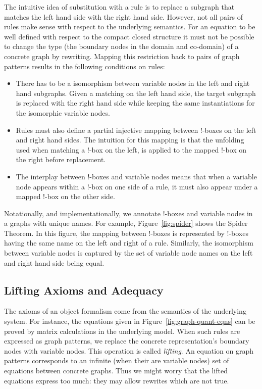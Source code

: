 \documentclass[runningheads]{llncs}
\begin{document}
The intuitive idea of substitution with a rule is to replace a
subgraph that matches the left hand side with the right hand side.
However, not all pairs of rules make sense with respect to the
underlying semantics. For an equation to be well defined with respect
to the compact closed structure it must not be possible to change the
type (the boundary nodes in the domain and co-domain) of a concrete
graph by rewriting.  Mapping this restriction back to pairs of graph
patterns results in the following conditions on rules:

\begin{itemize}

\item There has to be a isomorphism between variable nodes in the left
  and right hand subgraphs. Given a matching on the left hand side,
  the target subgraph is replaced with the right hand side while
  keeping the same instantiations for the isomorphic variable nodes.

\item Rules must also define a partial injective mapping between
  !-boxes on the left and right hand sides. The intuition for this
  mapping is that the unfolding used when matching a !-box on the
  left, is applied to the mapped !-box on the right before
  replacement.

\item The interplay between !-boxes and variable nodes means that when
  a variable node appears within a !-box on one side of a rule, it must
  also appear under a mapped !-box on the other side.

\end{itemize}

Notationally, and implementationally, we annotate !-boxes and variable
nodes in a graphs with unique names. For example,
Figure~\ref{fig:spider} shows the Spider Theorem. In this
figure, the mapping between !-boxes is represented by !-boxes having
the same name on the left and right of a rule.  Similarly, the
isomorphism between variable nodes is captured by the set of variable
node names on the left and right hand side being equal.

\subsection{Lifting Axioms and Adequacy} 

The axioms of an object formalism come from the semantics of the
underlying system. For instance, the equations given in
Figure~\ref{fig:graph-quant-eqns} can be proved by matrix
calculations in the underlying model. When such rules are expressed
as graph patterns, we replace the concrete representation's boundary
nodes with variable nodes. This operation is called \emph{lifting}. An
equation on graph patterns corresponds to an infinite (when their are
variable nodes) set of equations between concrete graphs. Thus we
might worry that the lifted equations express too much: they may allow
rewrites which are not true.
\end{document}
